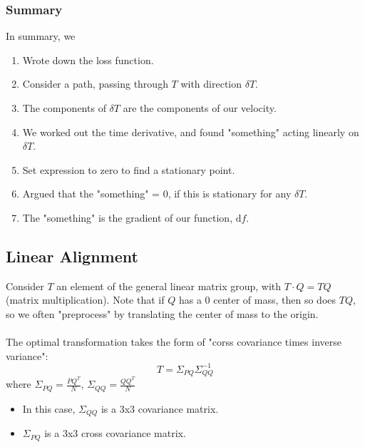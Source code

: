 \documentclass[10pt]{article}
\begin{document}
\subsubsection*{Summary}
In summary, we
\begin{enumerate}
    \item Wrote down the loss function.
    \item Consider a path, passing through $T$ with direction $\delta T$.
    \item The components of $\delta T$ are the components of our velocity.
    \item We worked out the time derivative, and found "something" acting linearly on $\delta T$.
    \item Set expression to zero to find a stationary point.
    \item Argued that the "something" = 0, if this is stationary for any $\delta T$.
    \item The "something" is the gradient of our function, $\text{d}f$.
\end{enumerate}

\subsection*{Linear Alignment}
Consider $T$ an element of the general linear matrix group, with $T \cdot Q = TQ$ (matrix multiplication).  Note that if $Q$ has a 0 center of mass, then so does $TQ$, so we often "preprocess" by translating the center of mass to the origin.\\\\
The optimal transformation takes the form of "corss covariance times inverse variance":
\[T = \Sigma_{PQ} \Sigma_{QQ}^{-1}\]
where $\Sigma_{PQ} = \frac{PQ^T}{N}$, $\Sigma_{QQ} = \frac{QQ^T}{N}$
\begin{itemize}
    \item In this case, $\Sigma_{QQ}$ is a 3x3 covariance matrix.
    \item $\Sigma_{PQ}$ is a 3x3 cross covariance matrix.
\end{itemize}
\end{document}
